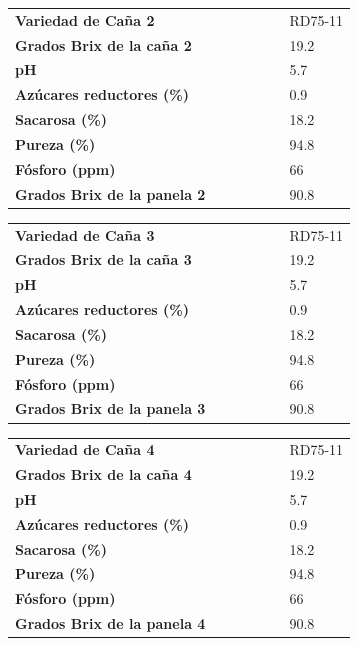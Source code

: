 \documentclass{article}%
\begin{document}
\linebreak%
\newline%
%
\linebreak%
\begin{tabular}{lcccccl}%
\textbf{Variedad de Caña 2}& & & & & &RD75{-}11\\%
\textbf{Grados Brix de la caña 2}& & & & & &19.2\\%
\textbf{pH}& & & & & &5.7\\%
\textbf{Azúcares reductores (\%)}& & & & & &0.9\\%
\textbf{Sacarosa (\%)}& & & & & &18.2\\%
\textbf{Pureza (\%)}& & & & & &94.8\\%
\textbf{Fósforo (ppm)}& & & & & &66\\%
\textbf{Grados Brix de la panela 2}& & & & & &90.8\\%
\end{tabular}%
\linebreak%
\newline%
%
\linebreak%
\begin{tabular}{lcccccl}%
\textbf{Variedad de Caña 3}& & & & & &RD75{-}11\\%
\textbf{Grados Brix de la caña 3}& & & & & &19.2\\%
\textbf{pH}& & & & & &5.7\\%
\textbf{Azúcares reductores (\%)}& & & & & &0.9\\%
\textbf{Sacarosa (\%)}& & & & & &18.2\\%
\textbf{Pureza (\%)}& & & & & &94.8\\%
\textbf{Fósforo (ppm)}& & & & & &66\\%
\textbf{Grados Brix de la panela 3}& & & & & &90.8\\%
\end{tabular}%
\linebreak%
\newline%
%
\linebreak%
\begin{tabular}{lcccccl}%
\textbf{Variedad de Caña 4}& & & & & &RD75{-}11\\%
\textbf{Grados Brix de la caña 4}& & & & & &19.2\\%
\textbf{pH}& & & & & &5.7\\%
\textbf{Azúcares reductores (\%)}& & & & & &0.9\\%
\textbf{Sacarosa (\%)}& & & & & &18.2\\%
\textbf{Pureza (\%)}& & & & & &94.8\\%
\textbf{Fósforo (ppm)}& & & & & &66\\%
\textbf{Grados Brix de la panela 4}& & & & & &90.8\\%
\end{tabular}%
\end{document}
